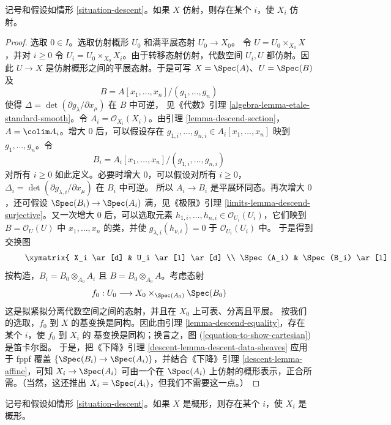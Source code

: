 \begin{lemma}
\label{lemma-limit-is-affine}
记号和假设如情形 \ref{situation-descent}。如果 $X$ 仿射，则存在某个
$i$，使 $X_i$ 仿射。
\end{lemma}

\begin{proof}
选取 $0\in I$。选取仿射概形 $U_0$ 和满平展态射 $U_0\to X_0$。
令 $U=U_0\times_{X_0}X$，并对 $i\geq0$ 令
$U_i=U_0\times_{X_0}X_i$。由于转移态射仿射，代数空间 $U_i,U$
都仿射。因此 $U\to X$ 是仿射概形之间的平展态射。于是可写
$X=\Spec(A)$、$U=\Spec(B)$ 及
$$
B = A[x_1, \ldots, x_n]/(g_1, \ldots, g_n)
$$
使得 $\Delta=\det(\partial g_\lambda/\partial x_\mu)$ 在 $B$ 中可逆，
见《代数》引理 \ref{algebra-lemma-etale-standard-smooth}。令
$A_i=\mathcal O_{X_i}(X_i)$。由引理 \ref{lemma-descend-section}，
$A=\colim A_i$。增大 $0$ 后，可以假设存在
$g_{1,i},\ldots,g_{n,i}\in A_i[x_1,\ldots,x_n]$ 映到
$g_1,\ldots,g_n$。令
$$
B_i = A_i[x_1, \ldots, x_n]/(g_{1, i}, \ldots, g_{n, i})
$$
对所有 $i\geq0$ 如此定义。必要时增大 $0$，可以假设对所有 $i\geq0$，
$\Delta_i=\det(\partial g_{\lambda,i}/\partial x_\mu)$ 在 $B_i$ 中可逆。
所以 $A_i\to B_i$ 是平展环同态。再次增大 $0$，还可假设
$\Spec(B_i)\to\Spec(A_i)$ 满，见《极限》引理
\ref{limits-lemma-descend-surjective}。又一次增大 $0$ 后，可以选取元素
$h_{1,i},\ldots,h_{n,i}\in\mathcal O_{U_i}(U_i)$，它们映到
$B=\mathcal O_U(U)$ 中 $x_1,\ldots,x_n$ 的类，并使
$g_{\lambda,i}(h_{\nu,i})=0$ 于 $\mathcal O_{U_i}(U_i)$ 中。
于是得到交换图
\begin{equation}
\label{equation-to-show-cartesian}
\vcenter{
\xymatrix{
X_i \ar[d] & U_i \ar[l] \ar[d] \\
\Spec(A_i) & \Spec(B_i) \ar[l]
}
}
\end{equation}
按构造，$B_i=B_0\otimes_{A_0}A_i$ 且
$B=B_0\otimes_{A_0}A$。考虑态射
$$
f_0 : U_0 \longrightarrow X_0 \times_{\Spec(A_0)} \Spec(B_0)
$$
这是拟紧拟分离代数空间之间的态射，并且在 $X_0$ 上可表、分离且平展。
按我们的选取，$f_0$ 到 $X$ 的基变换是同构。因此由引理
\ref{lemma-descend-equality}，存在某个 $i$，使 $f_0$ 到 $X_i$ 的
基变换是同构；换言之，图 (\ref{equation-to-show-cartesian}) 是笛卡尔图。
于是，把《下降》引理 \ref{descent-lemma-descent-data-sheaves} 应用于
fppf 覆盖 $\{\Spec(B_i)\to\Spec(A_i)\}$，并结合《下降》引理
\ref{descent-lemma-affine}，可知 $X_i\to\Spec(A_i)$ 可由一个在
$\Spec(A_i)$ 上仿射的概形表示，正合所需。（当然，这还推出
$X_i=\Spec(A_i)$，但我们不需要这一点。）
\end{proof}

\begin{lemma}
\label{lemma-limit-is-scheme}
记号和假设如情形 \ref{situation-descent}。如果 $X$ 是概形，则存在某个
$i$，使 $X_i$ 是概形。
\end{lemma}

